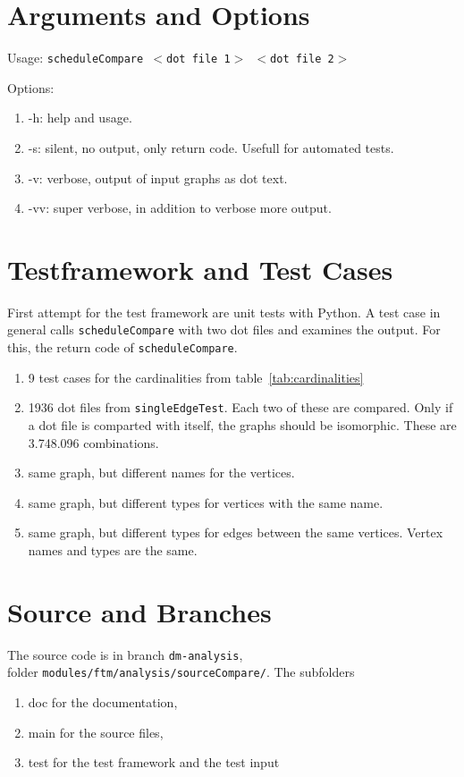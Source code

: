 \documentclass[12pt,a4paper]{report}
\begin{document}
\chapter{Arguments and Options}
Usage: \texttt{scheduleCompare $<$dot file 1$>$ $<$dot file 2$>$}

Options:
\begin{enumerate}
	\item -h: help and usage.
	\item -s: silent, no output, only return code. Usefull for automated tests.
	\item -v: verbose, output of input graphs as dot text.
	\item -vv: super verbose, in addition to verbose more output.
\end{enumerate}

\chapter{Testframework and Test Cases}
First attempt for the test framework are unit tests with Python. A test case in general calls \texttt{scheduleCompare} with two dot files and examines the output. For this, the return code of \texttt{scheduleCompare}.

\begin{enumerate}
	\item 9 test cases for the cardinalities from table~\ref{tab:cardinalities}
	\item 1936 dot files from \texttt{singleEdgeTest}. Each two of these are compared. Only if a dot file is comparted with itself, the graphs should be isomorphic. These are 3.748.096 combinations.
	\item same graph, but different names for the vertices.
	\item same graph, but different types for vertices with the same name.
	\item same graph, but different types for edges between the same vertices. Vertex names and types are the same.
\end{enumerate}

\chapter{Source and Branches}
The source code is in branch \texttt{dm-analysis}, \\ 
folder \texttt{modules/ftm/analysis/sourceCompare/}. The subfolders
\begin{enumerate}
	\item doc for the documentation,
	\item main for the source files,
	\item test for the test framework and the test input
\end{enumerate}
\end{document}
